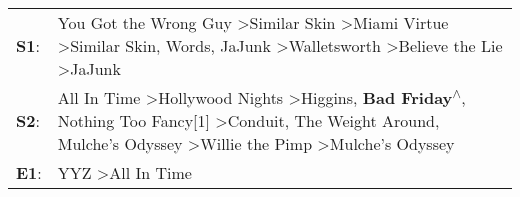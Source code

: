 \begin{supertabular}{p{0.03\textwidth}p{0.92\textwidth}}
 \textbf{S1}:  &                                                                      You Got the Wrong Guy\textsuperscript{} \textgreater \enspace Similar Skin\textsuperscript{} \textgreater \enspace Miami Virtue\textsuperscript{} \textgreater \enspace Similar Skin\textsuperscript{}, \enspace Words\textsuperscript{}, \enspace JaJunk\textsuperscript{} \textgreater \enspace Walletsworth\textsuperscript{} \textgreater \enspace Believe the Lie\textsuperscript{} \textgreater \enspace JaJunk\textsuperscript{}  \enspace  \\
 \textbf{S2}:  &  All In Time\textsuperscript{} \textgreater \enspace Hollywood Nights\textsuperscript{} \textgreater \enspace Higgins\textsuperscript{}, \enspace \textbf{Bad Friday\textsuperscript{$\wedge$}}, \enspace Nothing Too Fancy[1]\textsuperscript{} \textgreater \enspace Conduit\textsuperscript{}, \enspace The Weight Around\textsuperscript{}, \enspace Mulche's Odyssey\textsuperscript{} \textgreater \enspace Willie the Pimp\textsuperscript{} \textgreater \enspace Mulche's Odyssey\textsuperscript{}  \enspace  \\
 \textbf{E1}:  &                                                                                                                                                                                                                                                                                                                                                                                                                                    YYZ\textsuperscript{} \textgreater \enspace All In Time\textsuperscript{}  \enspace  \\
\end{supertabular}
